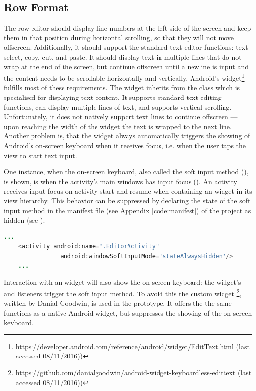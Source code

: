 \subsection{Row Format}
\label{impl_row_format}
The row editor should display line numbers at the left side of the screen and keep them in that position during horizontal scrolling, so that they will not move offscreen. Additionally, it should support the standard text editor functions: text select, copy, cut, and paste. It should display text in multiple lines that do not wrap at the end of the screen, but continue offscreen until a newline is input and the content needs to be scrollable horizontally and vertically. Android's  widget\footnote{\url{https://developer.android.com/reference/android/widget/EditText.html} (last accessed 08/11/2016))} fulfills most of these requirements. The  widget inherits from the class  which is specialised for displaying text content. It supports standard text editing functions, can display multiple lines of text, and supports vertical scrolling. Unfortunately, it does not natively support text lines to continue offscreen --- upon reaching the width of the widget the text is wrapped to the next line. Another problem is, that the widget always automatically triggers the showing of Android's on-screen keyboard when it receives focus, i.e. when the user taps the view to start text input. 

One instance, when the on-screen keyboard, also called the soft input method (\cite{android_softinputmethod}), is shown, is when the activity's main windows has input focus (\cite{android_windowsoftinputmode_docs}). An activity receives input focus on activity start and resume when containing an  widget in its view hierarchy. This behavior can be suppressed by declaring the state of the soft input method in the manifest file (see Appendix \ref{code:manifest}) of the project as hidden (see ).

\begin{lstlisting}[language=JAVA, caption=Declaring on-screen keyboard hidden in manifest file., label=lst:inputstate_hidden_manifest]
	...
	<activity android:name=".EditorActivity"
	            android:windowSoftInputMode="stateAlwaysHidden"/>
	...
\end{lstlisting}

Interaction with an  widget will also show the on-screen keyboard: the widget's  and  listeners trigger the soft input method. To avoid this the custom widget \footnote{\url{https://github.com/danialgoodwin/android-widget-keyboardless-edittext} (last accessed 08/11/2016))}, written by Danial Goodwin, is used in the prototype. It offers the the same functions as a native Android  widget, but suppresses the showing of the on-screen keyboard.

